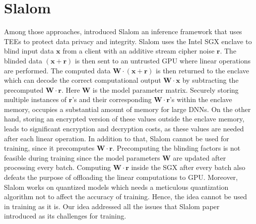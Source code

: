 \section{Slalom}

Among those approaches, \cite{tramer2018slalom} introduced Slalom an inference framework that uses TEEs to protect data privacy and integrity. Slalom uses the Intel SGX enclave to blind input data $\mathbf x$ from a client with an additive stream cipher noise $\mathbf r$. The blinded data $(\mathbf x +\mathbf r)$ is then sent to an untrusted GPU where linear operations are performed. The computed data  $\mathbf W \cdot (\mathbf x +\mathbf r)$ is then returned to the enclave which can decode the correct computational output $\mathbf W \cdot \mathbf x$ by subtracting the precomputed $\mathbf W \cdot \mathbf r$. Here $\mathbf W$ is the model parameter matrix.
Securely storing multiple instances of $\mathbf r$'s and their corresponding $\mathbf W \cdot \mathbf r$'s within the enclave memory, occupies a substantial amount of memory for large DNNs. On the other hand, storing an encrypted version of these values outside the enclave memory, leads to significant encryption and decryption costs, as these values are needed after each linear operation. In addition to that, Slalom cannot be used for training, since it precomputes $\mathbf W \cdot \mathbf r$. Precomputing the blinding factors is not feasible during training since the model parameters $\mathbf W$ are updated after processing every batch. Computing $\mathbf{W} \cdot \mathbf{r}$ inside the SGX after every batch also defeats the purpose of offloading the linear computations to GPU. Moreover, Slalom works on quantized models which needs a meticulous quantization algorithm not to affect the accuracy of training. Hence, the idea cannot be used in training as it is. Our idea addressed all the issues that Slalom paper introduced as its challenges for training.